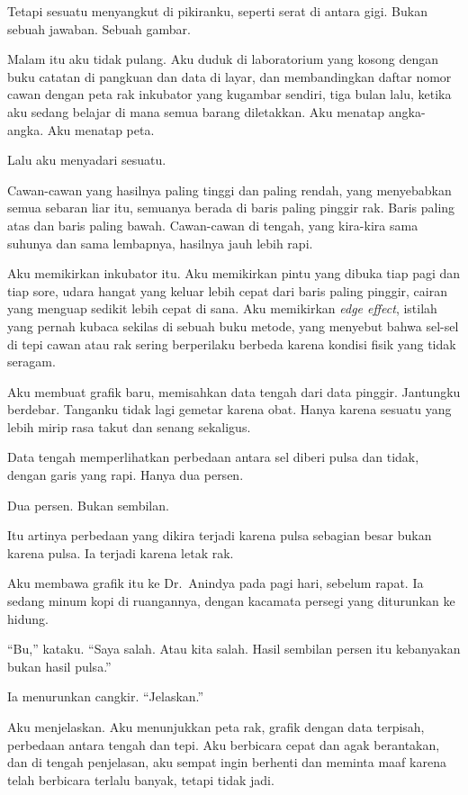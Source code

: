 \documentclass[11pt,twoside,openany]{book}
\makeatletter
\newcommand{\scenebreak}{\par\vspace{0.9em}{\centering\textsc{*\hspace{0.7em}*\hspace{0.7em}*}\par}\vspace{0.9em}\@afterindentfalse\@afterheading}
\makeatother
\begin{document}
Tetapi sesuatu menyangkut di pikiranku, seperti serat di antara gigi. Bukan sebuah jawaban. Sebuah gambar.

Malam itu aku tidak pulang. Aku duduk di laboratorium yang kosong dengan buku catatan di pangkuan dan data di layar, dan membandingkan daftar nomor cawan dengan peta rak inkubator yang kugambar sendiri, tiga bulan lalu, ketika aku sedang belajar di mana semua barang diletakkan. Aku menatap angka-angka. Aku menatap peta.

Lalu aku menyadari sesuatu.

Cawan-cawan yang hasilnya paling tinggi dan paling rendah, yang menyebabkan semua sebaran liar itu, semuanya berada di baris paling pinggir rak. Baris paling atas dan baris paling bawah. Cawan-cawan di tengah, yang kira-kira sama suhunya dan sama lembapnya, hasilnya jauh lebih rapi.

Aku memikirkan inkubator itu. Aku memikirkan pintu yang dibuka tiap pagi dan tiap sore, udara hangat yang keluar lebih cepat dari baris paling pinggir, cairan yang menguap sedikit lebih cepat di sana. Aku memikirkan \emph{edge effect}, istilah yang pernah kubaca sekilas di sebuah buku metode, yang menyebut bahwa sel-sel di tepi cawan atau rak sering berperilaku berbeda karena kondisi fisik yang tidak seragam.

Aku membuat grafik baru, memisahkan data tengah dari data pinggir. Jantungku berdebar. Tanganku tidak lagi gemetar karena obat. Hanya karena sesuatu yang lebih mirip rasa takut dan senang sekaligus.

Data tengah memperlihatkan perbedaan antara sel diberi pulsa dan tidak, dengan garis yang rapi. Hanya dua persen.

Dua persen. Bukan sembilan.

Itu artinya perbedaan yang dikira terjadi karena pulsa sebagian besar bukan karena pulsa. Ia terjadi karena letak rak.

\scenebreak
Aku membawa grafik itu ke Dr.~Anindya pada pagi hari, sebelum rapat. Ia sedang minum kopi di ruangannya, dengan kacamata persegi yang diturunkan ke hidung.

``Bu,'' kataku. ``Saya salah. Atau kita salah. Hasil sembilan persen itu kebanyakan bukan hasil pulsa.''

Ia menurunkan cangkir. ``Jelaskan.''

Aku menjelaskan. Aku menunjukkan peta rak, grafik dengan data terpisah, perbedaan antara tengah dan tepi. Aku berbicara cepat dan agak berantakan, dan di tengah penjelasan, aku sempat ingin berhenti dan meminta maaf karena telah berbicara terlalu banyak, tetapi tidak jadi.
\end{document}
